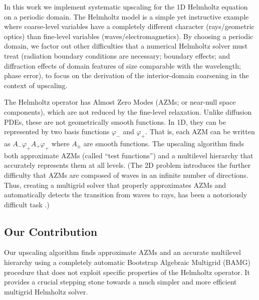 \documentclass{article}
\begin{document}
In this work we implement systematic upscaling for the 1D Helmholtz equation on a periodic domain. The Helmholtz model is a simple yet instructive example where coarse-level variables have a completely different character (rays/geometric optics) than fine-level variables (waves/electromagnetics). By choosing a periodic domain, we factor out other difficulties that a numerical Helmholtz solver must treat (radiation boundary conditions are necessary; boundary effects; and diffraction effects of domain features of size comparable with the wavelength; phase error), to focus on the derivation of the interior-domain coarsening in the context of upscaling.


The Helmholtz operator has Almost Zero Modes (AZMs; or near-null space components), which are not reduced by the fine-level relaxation. Unlike diffusion PDEs, these are not geometrically smooth functions. In 1D, they can be represented by two basis functions $\varphi_-$ and $\varphi_+$. That is, each AZM can be written as $A_- \varphi_+ A_+ \varphi_+$ where $A_{\pm}$ are smooth functions. The upscaling algorithm finds both approximate AZMs (called ``test functions'') and a multilevel hierarchy that accurately represents them at all levels. (The 2D problem introduces the further difficulty that AZMs are composed of waves in an infinite number of directions. Thus, creating a multigrid solver that properly approximates AZMs and automatically detects the transition from waves to rays, has been a notoriously difficult task \cite{wave_ray, later_papers}.)

\subsection{Our Contribution}



Our upscaling algorithm finds approximate AZMs and an accurate multilevel hierarchy using a completely automatic Bootstrap Algebraic Multigrid (BAMG) procedure that does not exploit specific properties of the Helmholtz operator. It provides a crucial stepping stone towards a much simpler and more efficient multigrid Helmholtz solver.
\end{document}
